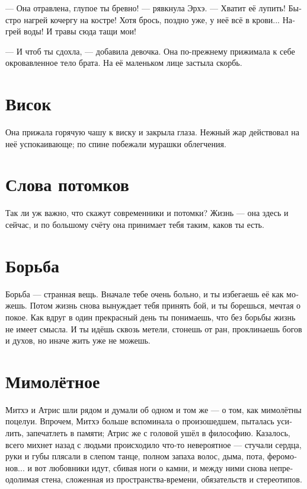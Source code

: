 \documentclass[a4paper,12pt,fleqn]{book}\usepackage{cooltooltips}\usepackage{polyglossia}\setdefaultlanguage[babelshorthands=true]{russian}\setotherlanguage{english}\defaultfontfeatures{Ligatures=TeX,Mapping=tex-text} \usepackage{xcolor}\definecolor{lightgray}{HTML}{bbbbbb}\color{lightgray}\newcommand{\ml}[3]{\textenglish{\textcolor{black}{#3}}}
\begin{document}
{--- Она отравлена, глупое ты бревно! --- рявкнула Эрхэ.
--- Хватит её лупить!
Быстро нагрей кочергу на костре!
Хотя брось, поздно уже, у неё всё в крови...
Нагрей воды!
И травы сюда тащи мои!

--- И чтоб ты сдохла, --- добавила девочка.
Она по-прежнему прижимала к себе окровавленное тело брата.
На её маленьком лице застыла скорбь.

\section{Висок}

Она прижала горячую чашу к виску и закрыла глаза.
Нежный жар действовал на неё успокаивающе;
по спине побежали мурашки облегчения.

\section{Слова потомков}

Так ли уж важно, что скажут современники и потомки?
Жизнь --- она здесь и сейчас, и по большому счёту она принимает тебя таким, каков ты есть.

\section{Борьба}

Борьба --- странная вещь.
Вначале тебе очень больно, и ты избегаешь её как можешь.
Потом жизнь снова вынуждает тебя принять бой, и ты борешься, мечтая о покое.
Как вдруг в один прекрасный день ты понимаешь, что без борьбы жизнь не имеет смысла.
И ты идёшь сквозь метели, стонешь от ран, проклинаешь богов и духов, но иначе жить уже не можешь.

\section{Мимолётное}

Митхэ и Атрис шли рядом и думали об одном и том же --- о том, как мимолётны поцелуи.
Впрочем, Митхэ больше вспоминала о произошедшем, пыталась усилить, запечатлеть в памяти;
Атрис же с головой ушёл в философию.
Казалось, всего михнет назад с людьми происходило что-то невероятное --- стучали сердца, руки и губы плясали в слепом танце, полном запаха волос, дыма, пота, феромонов... и вот любовники идут, сбивая ноги о камни, и между ними снова непреодолимая стена, сложенная из пространства-времени, обязательств и стереотипов.

}
\end{document}
